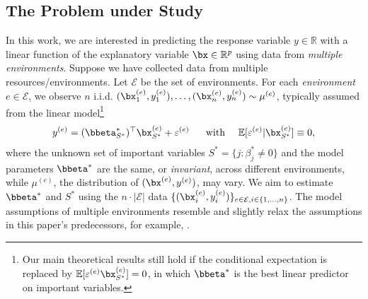 \documentclass[10pt]{article}
\numberwithin{equation}{section}
\begin{document}
{\subsection{The Problem under Study}

In this work, we are interested in predicting the response variable $y \in \mathbb{R}$ with a linear function of the explanatory variable $\bx \in \mathbb{R}^p$ using data from \emph{multiple environments}. Suppose we have collected data from multiple resources/environments. Let $\mathcal{E}$ be the set of environments. For each \emph{environment} $e\in \mathcal{E}$, we observe $n$ i.i.d. $(\bx_1^{(e)}, y_1^{(e)}), \ldots, (\bx_n^{(e)}, y^{(e)}_n) \sim \mu^{(e)}$, typically assumed from the linear model\footnote{Our main theoretical results still hold if the conditional expectation is replaced by $\mathbb{E}[\varepsilon^{(e)} \bx_{S^*}^{(e)}]=0$, in which $\bbeta^*$ is the best linear predictor on important variables.}
\begin{align}
\label{eq:intro-dgp}
    y^{(e)} = (\bbeta^*_{S^*})^\top \bx_{S^*}^{(e)} + \varepsilon^{(e)} ~~~~~ \text{with} ~~~~ \mathbb{E}[\varepsilon^{(e)}|\bx_{S^*}^{(e)}] \equiv 0,
\end{align} where the unknown set of important variables $S^* = \{j: \beta_j^* \neq 0\}$ and the model parameters $\bbeta^*$ are the same, or \emph{invariant}, across different environments, while $\mu^{(e)}$, the distribution of $(\bx^{(e)},y^{(e)})$, may vary. We aim to estimate $\bbeta^*$ and $S^*$ using the $n\cdot |\mathcal{E}|$ data $\{(\bx_i^{(e)}, y_i^{(e)})\}_{e\in \mathcal{E}, i\in \{1,\ldots, n\}}$. The model assumptions of multiple environments resemble and slightly relax the assumptions in this paper's predecessors, for example, \cite{peters2016causal, rojas2018invariant, pfister2021stabilizing, yin2021optimization}.

}
\end{document}
